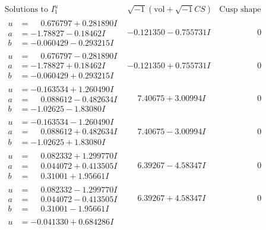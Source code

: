 \documentclass[1p]{elsarticle_modified}
\theoremstyle{definition}
\newcommand{\I}{\sqrt{-1}}
\begin{document}
$$\begin{array}{c|c|c}
\text{Solutions to }I^u_{1}& \I (\text{vol} + \sqrt{-1}CS) & \text{Cusp shape}\\
 \hline 
\begin{aligned}
u &= \phantom{-}0.676797 + 0.281890 I \\
a &= -1.78827 - 0.18462 I \\
b &= -0.060429 - 0.293215 I\end{aligned}
 & -0.121350 - 0.755731 I & \phantom{-0.000000 } 0 \\ \hline\begin{aligned}
u &= \phantom{-}0.676797 - 0.281890 I \\
a &= -1.78827 + 0.18462 I \\
b &= -0.060429 + 0.293215 I\end{aligned}
 & -0.121350 + 0.755731 I & \phantom{-0.000000 } 0 \\ \hline\begin{aligned}
u &= -0.163534 + 1.260490 I \\
a &= \phantom{-}0.088612 - 0.482634 I \\
b &= -1.02625 - 1.83080 I\end{aligned}
 & \phantom{-}7.40675 + 3.00994 I & \phantom{-0.000000 } 0 \\ \hline\begin{aligned}
u &= -0.163534 - 1.260490 I \\
a &= \phantom{-}0.088612 + 0.482634 I \\
b &= -1.02625 + 1.83080 I\end{aligned}
 & \phantom{-}7.40675 - 3.00994 I & \phantom{-0.000000 } 0 \\ \hline\begin{aligned}
u &= \phantom{-}0.082332 + 1.299770 I \\
a &= \phantom{-}0.044072 + 0.413505 I \\
b &= \phantom{-}0.31001 + 1.95661 I\end{aligned}
 & \phantom{-}6.39267 - 4.58347 I & \phantom{-0.000000 } 0 \\ \hline\begin{aligned}
u &= \phantom{-}0.082332 - 1.299770 I \\
a &= \phantom{-}0.044072 - 0.413505 I \\
b &= \phantom{-}0.31001 - 1.95661 I\end{aligned}
 & \phantom{-}6.39267 + 4.58347 I & \phantom{-0.000000 } 0 \\ \hline\begin{aligned}
u &= -0.041330 + 0.684286 I \\

\end{aligned}
\end{array}$$
\end{document}
